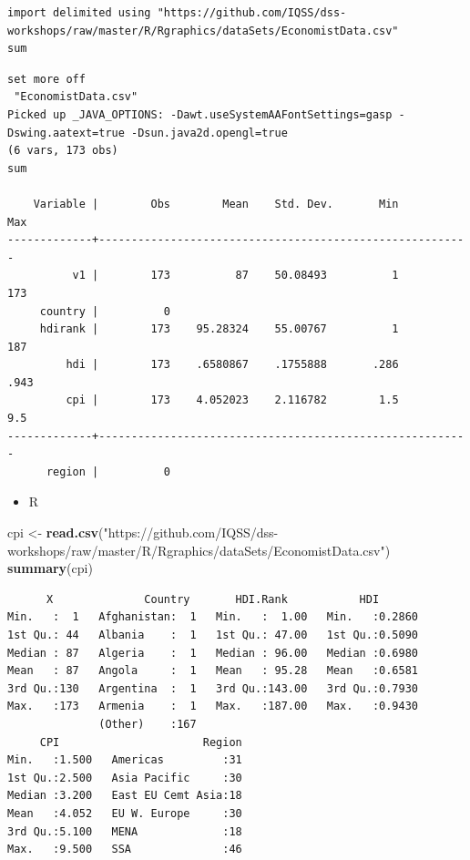 \documentclass[]{book}
\newenvironment{Shaded}{\begin{snugshade}}{\end{snugshade}}
\newcommand{\KeywordTok}[1]{\textcolor[rgb]{0.13,0.29,0.53}{\textbf{#1}}}
\newcommand{\NormalTok}[1]{#1}
\newcommand{\StringTok}[1]{\textcolor[rgb]{0.31,0.60,0.02}{#1}}
\providecommand{\tightlist}{%
  \setlength{\itemsep}{0pt}\setlength{\parskip}{0pt}}
\begin{document}
\begin{verbatim}
import delimited using "https://github.com/IQSS/dss-workshops/raw/master/R/Rgraphics/dataSets/EconomistData.csv"
sum
\end{verbatim}

\begin{verbatim}
set more off
 "EconomistData.csv"
Picked up _JAVA_OPTIONS: -Dawt.useSystemAAFontSettings=gasp -Dswing.aatext=true -Dsun.java2d.opengl=true
(6 vars, 173 obs)
sum

    Variable |        Obs        Mean    Std. Dev.       Min        Max
-------------+---------------------------------------------------------
          v1 |        173          87    50.08493          1        173
     country |          0
     hdirank |        173    95.28324    55.00767          1        187
         hdi |        173    .6580867    .1755888       .286       .943
         cpi |        173    4.052023    2.116782        1.5        9.5
-------------+---------------------------------------------------------
      region |          0
\end{verbatim}

\begin{itemize}
\tightlist
\item
  R
\end{itemize}

\begin{Shaded}
\begin{Highlighting}[]
\NormalTok{cpi <-}\StringTok{ }\KeywordTok{read.csv}\NormalTok{(}\StringTok{"https://github.com/IQSS/dss-workshops/raw/master/R/Rgraphics/dataSets/EconomistData.csv"}\NormalTok{)}
\KeywordTok{summary}\NormalTok{(cpi)}
\end{Highlighting}
\end{Shaded}

\begin{verbatim}
      X              Country       HDI.Rank           HDI        
Min.   :  1   Afghanistan:  1   Min.   :  1.00   Min.   :0.2860  
1st Qu.: 44   Albania    :  1   1st Qu.: 47.00   1st Qu.:0.5090  
Median : 87   Algeria    :  1   Median : 96.00   Median :0.6980  
Mean   : 87   Angola     :  1   Mean   : 95.28   Mean   :0.6581  
3rd Qu.:130   Argentina  :  1   3rd Qu.:143.00   3rd Qu.:0.7930  
Max.   :173   Armenia    :  1   Max.   :187.00   Max.   :0.9430  
              (Other)    :167                                    
     CPI                      Region  
Min.   :1.500   Americas         :31  
1st Qu.:2.500   Asia Pacific     :30  
Median :3.200   East EU Cemt Asia:18  
Mean   :4.052   EU W. Europe     :30  
3rd Qu.:5.100   MENA             :18  
Max.   :9.500   SSA              :46
\end{verbatim}
\end{document}
